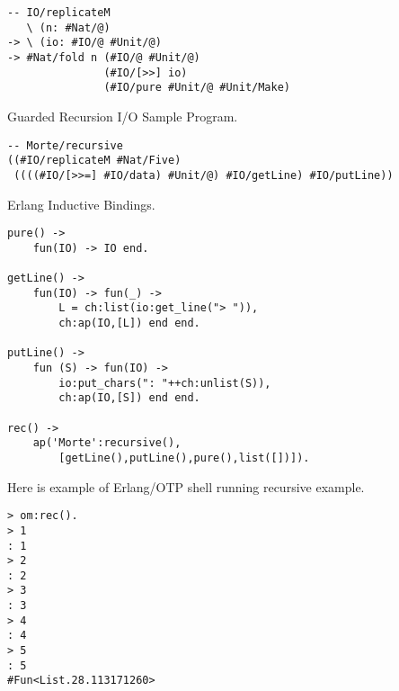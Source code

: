 \begin{lstlisting}[mathescape=true]
-- IO/replicateM
   \ (n: #Nat/@)
-> \ (io: #IO/@ #Unit/@)
-> #Nat/fold n (#IO/@ #Unit/@)
               (#IO/[>>] io)
               (#IO/pure #Unit/@ #Unit/Make)
\end{lstlisting}

Guarded Recursion I/O Sample Program.

\begin{lstlisting}[mathescape=true]
-- Morte/recursive
((#IO/replicateM #Nat/Five)
 ((((#IO/[>>=] #IO/data) #Unit/@) #IO/getLine) #IO/putLine))
\end{lstlisting}

Erlang Inductive Bindings.

\begin{lstlisting}[mathescape=true]
pure() ->
    fun(IO) -> IO end.

getLine() ->
    fun(IO) -> fun(_) ->
        L = ch:list(io:get_line("> ")),
        ch:ap(IO,[L]) end end.

putLine() ->
    fun (S) -> fun(IO) ->
        io:put_chars(": "++ch:unlist(S)),
        ch:ap(IO,[S]) end end.

rec() ->
    ap('Morte':recursive(),
        [getLine(),putLine(),pure(),list([])]).
\end{lstlisting}


Here is example of Erlang/OTP shell running recursive example.

\begin{lstlisting}[mathescape=true]
> om:rec().
> 1
: 1
> 2
: 2
> 3
: 3
> 4
: 4
> 5
: 5
#Fun<List.28.113171260>
\end{lstlisting}

\newpage
\documentclass[twocolumn]{article}
\section{Словник термінів}

З області програмування:
\\
\\
Формальні методи --- \\
Система типізації --- \\
Типова сигнатура --- \\
Імплементація --- \\
Інтерпретатор --- \\
Мова програмування --- \\
Теорія типів --- \\
Компіляція --- \\
Базова бібліотека --- \\
Середовище виконання --- \\
Вищі мови програмування --- \\
BNF нотація --- \\
Синтаксичне дерево --- \\
Синтаксис --- \\
Семантика --- \\

